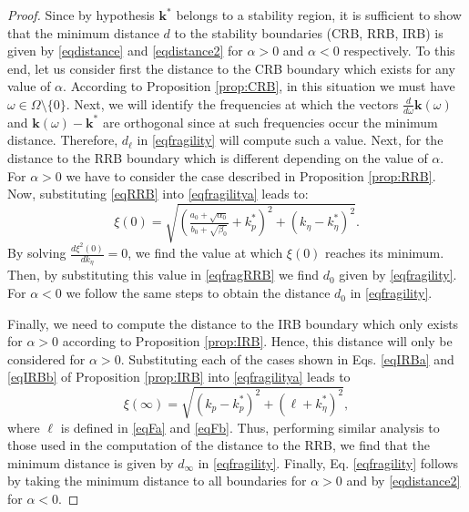 \documentclass[twoside,reqno,11pt]{fcaa-var} %
\begin{document}
\begin{proof}
	Since by hypothesis $\bm{k}^*$ belongs to a stability region, it is sufficient to show that the minimum distance $d$ to the stability boundaries (CRB, RRB, IRB) is given by \eqref{eqdistance} and \eqref{eqdistance2} for $\alpha>0$ and $\alpha<0$ respectively. To this end, let us consider first the distance to the CRB boundary which exists for any value of $\alpha$. According to Proposition \ref{prop:CRB}, in this situation we must have $\omega\in\Omega\setminus\{0\}$. Next, 
	we will identify the frequencies at which the vectors $\frac{d}{d\omega}\bm{k}(\omega)$ and $\bm{k}(\omega)-\bm{k}^*$ are orthogonal since at such frequencies occur the minimum distance. Therefore, $d_\ell$ in \eqref{eqfragility} will compute such a value. Next, for the distance to the RRB boundary which is different depending on the value of $\alpha$. For $\alpha>0$ we have to consider the case  described in Proposition \ref{prop:RRB}. Now, substituting \eqref{eqRRB} into \eqref{eqfragilitya} leads to:
	\begin{equation}
	\xi(0)=\sqrt{{(\tfrac{a_0+\sqrt{\alpha_0}}{b_0+\sqrt{\beta_0}}+k_p^*)}^{2}+{(k_\eta-k_\eta^*)}^{2}}. \label{eqfragRRB}
	\end{equation}
	By solving $\tfrac{d\xi^2(0)}{dk_\eta}=0$, we find the value at which $\xi(0)$ reaches its minimum. Then, by substituting this value in \eqref{eqfragRRB} we find $d_0$ given by \eqref{eqfragility}. For $\alpha<0$ we follow the same steps to obtain the distance $d_0$ in \eqref{eqfragility}.\par 
	Finally, we need to compute the distance to the IRB boundary which only exists for $\alpha>0$ according to Proposition \ref{prop:IRB}. Hence, this distance will only be considered for $\alpha>0$. Substituting each of the cases shown in Eqs. \eqref{eqIRBa} and \eqref{eqIRBb} of Proposition \ref{prop:IRB} into \eqref{eqfragilitya} leads to
	\begin{equation}
	\xi(\infty)=\sqrt{(k_p-k_p^*)^2+(\ell+k_\eta^*)^2}, \label{eqfragilityb}
	\end{equation}
	where $\ell$ is defined in \eqref{eqFa} and \eqref{eqFb}. Thus, performing similar analysis to those used in the computation of the distance to the RRB, we find that the minimum distance is given by $d_\infty$ in \eqref{eqfragility}.
	Finally, Eq. \eqref{eqfragility} follows by taking the minimum distance to all boundaries for $\alpha>0$ and by \eqref{eqdistance2} for $\alpha<0$.

\end{proof}
\end{document}
